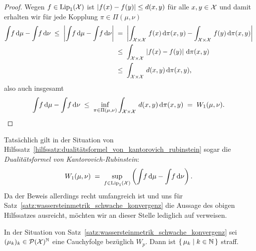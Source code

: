 \documentclass[../thesis/thesis.tex]{subfiles}
\begin{document}
	\begin{proof}
		Wegen $f \in \mathrm{Lip}_1(\mathcal{X})$ ist $\left| f(x) - f(y) \right| \leq d(x, y)$ für alle $x, y \in \mathcal{X}$ und damit erhalten wir für jede Kopplung $\pi \in \Pi(\mu, \nu)$
		\begin{align*}
			\int_{} \, f \, \mathrm{d}\mu - \int_{} \, f \, \mathrm{d}\nu \; \leq \; \left| \int_{} \, f \, \mathrm{d}\mu - \int_{} \, f \, \mathrm{d}\nu \right|
			                                               \; &= \; \left| \int_{\mathcal{X} \times \mathcal{X}} \, f(x) \, \mathrm{d}\pi(x, y) - \int_{\mathcal{X} \times \mathcal{X}} \, f(y) \, \mathrm{d}\pi(x, y) \right| \\
			                                                 &\leq \; \int_{\mathcal{X} \times \mathcal{X}} \, \left| f(x)-f(y) \right| \, \mathrm{d}\pi(x, y) \\
			                                                 &\leq \; \int_{\mathcal{X} \times \mathcal{X}} \, d(x, y) \, \mathrm{d}\pi(x, y) \text{,}
		\end{align*}
		also auch insgesamt
		\[ \int_{} \, f \, \mathrm{d}\mu - \int_{} \, f \, \mathrm{d}\nu \; \leq \; \inf_{\pi \in \Pi(\mu, \nu)} \int_{\mathcal{X} \times \mathcal{X}} \, d(x, y) \, \mathrm{d}\pi(x, y) \; = \; W_1(\mu, \nu) \text{.} \qedhere \]
	\end{proof}

	\begin{Bemerkung}
		Tatsächlich gilt in der Situation von Hilfssatz~\ref{hilfssatz:dualitätsformel_von_kantorovich_rubinstein} sogar die \emph{Dualitätsformel von Kantorovich-Rubinstein}:
		\[ W_1(\mu, \nu) \; = \; \sup_{f \in \mathrm{Lip}_1(\mathcal{X})} \left( \int_{} \, f \, \mathrm{d}\mu - \int_{} \, f \, \mathrm{d}\nu \right) \text{.} \]
		Da der Beweis allerdings recht umfangreich ist und uns für Satz~\ref{satz:wassersteinmetrik_schwache_konvergenz} die Aussage des obigen Hilfssatzes ausreicht, 
		möchten wir an dieser Stelle lediglich auf \cite[Remark 6.5]{Villani.2009} verweisen.
	\end{Bemerkung}

	\begin{Hilfssatz}
		\label{hilfssatz:wasserstein-cauchyfolgen_straff}
		In der Situation von Satz~\ref{satz:wassersteinmetrik_schwache_konvergenz} sei $(\mu_k)_k \in \mathcal{P}(\mathcal{X})^{\mathbb{N}}$ eine Cauchyfolge
		bezüglich $W_p$. Dann ist $\left\{\, \mu_k \; \middle| \; k \in \mathbb{N} \,\right\}$ straff.
	\end{Hilfssatz}
\end{document}
